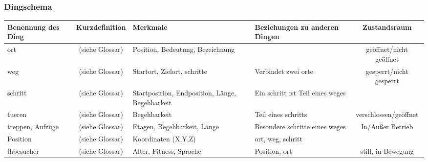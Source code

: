 \subsubsection*{Dingschema}
\begin{center}
    \begin{tabular}{ | p{2.2cm} | c | p{2.8cm} | p{2.5cm} | c | }
    \hline
    \textbf{Benennung des Ding} & \textbf{Kurzdefinition} & \textbf{Merkmale} & \textbf{Beziehungen zu anderen Dingen} & \textbf{Zustandsraum} \\ \hline
    \gls{ort} & (siehe Glossar) & Position, Bedeutung, Bezeichnung & & geöffnet/nicht geöffnet \\ \hline
    \gls{weg} & (siehe Glossar) & Startort, Zielort, \gls{schritt}e & Verbindet zwei \gls{ort}e & gesperrt/nicht gesperrt\\ \hline 
    \gls{schritt} & (siehe Glossar) & Startposition, Endposition, Länge, Begehbarkeit & Ein \gls{schritt} ist Teil eines \gls{weg}es &\\ \hline 
    \gls{tuer}en & (siehe Glossar) & Begehbarkeit & Teil eines \gls{schritt}s & verschlossen/geöffnet\\ \hline 
    \gls{treppe}n, Aufzüge & (siehe Glossar) & Etagen, Begehbarkeit, Länge & Besondere \gls{schritt}e eines \gls{weg}es & In/Außer Betrieb\\ \hline 
    Position & (siehe Glossar) & Koordinaten (X,Y,Z) & \gls{ort}, \gls{weg}, \gls{schritt} &\\ \hline 
    \gls{fhbesucher} & (siehe Glossar) & Alter, Fitness, Sprache & Position, \gls{ort} & still, in Bewegung\\ \hline 
    \end{tabular}
\end{center}